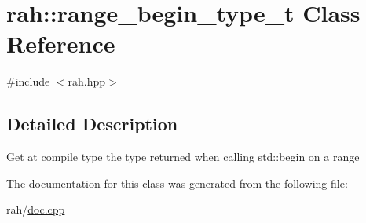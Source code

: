 \hypertarget{classrah_1_1range__begin__type__t}{}\section{rah\+::range\+\_\+begin\+\_\+type\+\_\+t Class Reference}
\label{classrah_1_1range__begin__type__t}


{\ttfamily \#include $<$rah.\+hpp$>$}



\subsection{Detailed Description}
Get at compile type the type returned when calling std\+::begin on a range 
\begin{DoxyCode}{0}
\DoxyCodeLine{\{}
\end{DoxyCode}
 

The documentation for this class was generated from the following file\+:\begin{DoxyCompactItemize}
\item 
rah/\mbox{\hyperlink{doc_8cpp}{doc.\+cpp}}\end{DoxyCompactItemize}
